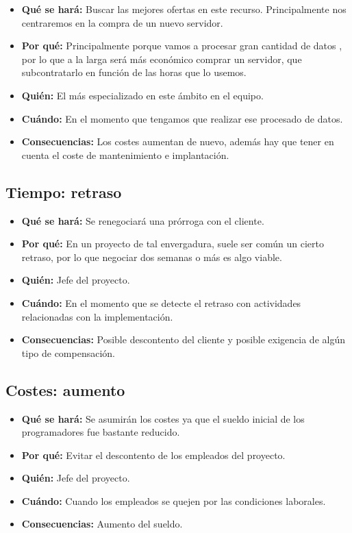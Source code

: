 \begin{itemize}
	\item \textbf{Qué se hará: } Buscar las mejores ofertas en este recurso. Principalmente nos centraremos en la compra de un nuevo servidor.
	\item \textbf{Por qué: } Principalmente porque vamos a procesar gran cantidad de datos , por lo que a la larga será más económico comprar un servidor, que subcontratarlo en función de las horas que lo usemos.
	\item \textbf{Quién: } El más especializado en este ámbito en el equipo.
	\item \textbf{Cuándo: } En el momento que tengamos que realizar ese procesado de datos.
	\item \textbf{Consecuencias: } Los costes aumentan de nuevo, además hay que tener en cuenta el coste de mantenimiento e implantación.
\end{itemize}

\subsection{Tiempo: retraso}

\begin{itemize}
	\item \textbf{Qué se hará: } Se renegociará una prórroga con el cliente.
	\item \textbf{Por qué: } En un proyecto de tal envergadura, suele ser común un cierto retraso, por lo que negociar dos semanas o más es algo viable.
	\item \textbf{Quién: } Jefe del proyecto.
	\item \textbf{Cuándo: } En el momento que se detecte el retraso con actividades relacionadas con la implementación.
	\item \textbf{Consecuencias: } Posible descontento del cliente y posible exigencia de algún tipo de compensación.
\end{itemize}

\subsection{Costes: aumento}

\begin{itemize}
	\item \textbf{Qué se hará: } Se asumirán los costes ya que el sueldo inicial de los programadores fue bastante reducido.
	\item \textbf{Por qué: } Evitar el descontento de los empleados del proyecto.
	\item \textbf{Quién: } Jefe del proyecto.
	\item \textbf{Cuándo: } Cuando los empleados se quejen por las condiciones laborales.
	\item \textbf{Consecuencias: } Aumento del sueldo.
\end{itemize}

